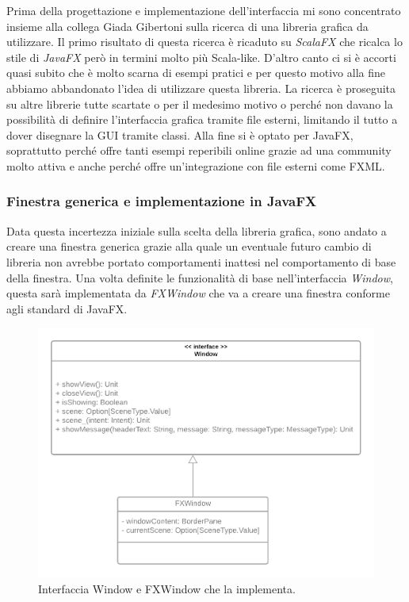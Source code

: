 Prima della progettazione e implementazione dell'interfaccia mi sono concentrato insieme alla collega Giada Gibertoni sulla ricerca di una libreria grafica da utilizzare.
Il primo risultato di questa ricerca è ricaduto su \textit{ScalaFX} che ricalca lo stile di \textit{JavaFX} però in termini molto più Scala-like.
D'altro canto ci si è accorti quasi subito che è molto scarna di esempi pratici e per questo motivo alla fine abbiamo abbandonato l'idea di utilizzare questa libreria.
La ricerca è proseguita su altre librerie tutte scartate o per il medesimo motivo o perché non davano la possibilità di definire l'interfaccia grafica tramite file esterni, limitando il tutto a dover disegnare la GUI tramite classi.
Alla fine si è optato per JavaFX, soprattutto perché offre tanti esempi reperibili online grazie ad una community molto attiva e anche perché offre un'integrazione con file esterni come FXML.

\subsubsection{Finestra generica e implementazione in JavaFX}

Data questa incertezza iniziale sulla scelta della libreria grafica, sono andato a creare una finestra generica grazie alla quale un eventuale futuro cambio di libreria non avrebbe portato comportamenti inattesi nel comportamento di base della finestra.
Una volta definite le funzionalità di base nell'interfaccia \textit{Window}, questa sarà implementata da \textit{FXWindow} che va a creare una finestra conforme agli standard di JavaFX.

\begin{figure}[H]
  \includegraphics[width=15cm]{../res/6-implementazione/chiana/UML_Window.png}
  \caption{Interfaccia Window e FXWindow che la implementa.}
  \label{arenaCLass}
\end{figure}


